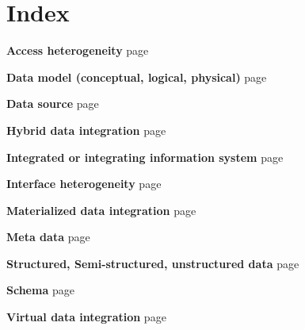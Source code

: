 \chapter{Index}

\textbf{Access heterogeneity} page \pageref{technical_heterogeneity_subtypes}

\textbf{Data model (conceptual, logical, physical)} page \pageref{data_model_index}

\textbf{Data source} page \pageref{data_source_index}

\textbf{Hybrid data integration} page \pageref{hybrid_index}

\textbf{Integrated or integrating information system} page \pageref{integrated_system_index}

\textbf{Interface heterogeneity} page \pageref{technical_heterogeneity_subtypes}

\textbf{Materialized data integration} page \pageref{materialized_index}

\textbf{Meta data} page \pageref{meta_data_index}

\textbf{Structured, Semi-structured, unstructured data} page \pageref{type_of_data_label}

\textbf{Schema} page \pageref{schema_index}

\textbf{Virtual data integration} page \pageref{virtual_index}

